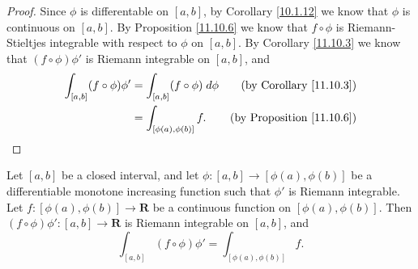 \begin{proof}
    Since \(\phi\) is differentable on \([a, b]\), by Corollary \ref{10.1.12} we know that \(\phi\) is continuous on \([a, b]\).
    By Proposition \ref{11.10.6} we know that \(f \circ \phi\) is Riemann-Stieltjes integrable with respect to \(\phi\) on \([a, b]\).
    By Corollary \ref{11.10.3} we know that \((f \circ \phi) \phi'\) is Riemann integrable on \([a, b]\), and
    \begin{align*}
        \int_{[a, b]} (f \circ \phi) \phi' & = \int_{[a, b]} (f \circ \phi) \; d \phi & \text{(by Corollary \ref{11.10.3})}   \\
                                           & = \int_{[\phi(a), \phi(b)]} f.           & \text{(by Proposition \ref{11.10.6})}
    \end{align*}
\end{proof}

\begin{additional corollary}\label{ac 11.10.1}
Let \([a, b]\) be a closed interval, and let \(\phi : [a, b] \to [\phi(a), \phi(b)]\) be a differentiable monotone increasing function such that \(\phi'\) is Riemann integrable.
Let \(f : [\phi(a), \phi(b)] \to \mathbf{R}\) be a continuous function on \([\phi(a), \phi(b)]\).
Then \((f \circ \phi) \phi' : [a, b] \to \mathbf{R}\) is Riemann integrable on \([a, b]\), and
\[
    \int_{[a, b]} (f \circ \phi) \phi' = \int_{[\phi(a), \phi(b)]} f.
\]
\end{additional corollary}

